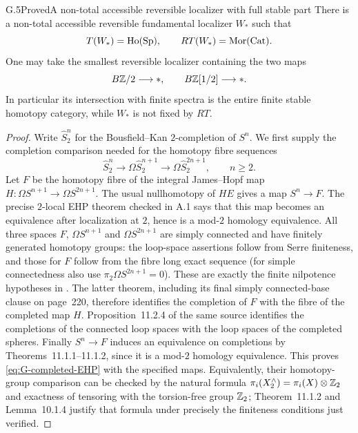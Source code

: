 \begin{claim}{G.5}{Proved}{A non-total accessible reversible localizer with full stable part}
There is a non-total accessible reversible fundamental localizer $W_*$ such that
\[
 T(W_*)=\operatorname{Ho}(\mathrm{Sp}),\qquad RT(W_*)=\operatorname{Mor}(\mathrm{Cat}).
\]
One may take the smallest reversible localizer containing the two maps
\[
 B\mathbb Z/2\longrightarrow *,\qquad B\mathbb Z[1/2]\longrightarrow *.
\]
In particular its intersection with finite spectra is the entire finite stable homotopy category, while $W_*$ is not fixed by $RT$.
\end{claim}
\begin{proof}
Write $\widehat S^n_2$ for the Bousfield--Kan $2$-completion of $S^n$. We first supply the completion comparison needed for the homotopy fibre sequences
\begin{equation}\label{eq:G-completed-EHP}
 \widehat S^n_2\longrightarrow\Omega\widehat S^{n+1}_2
       \longrightarrow\Omega\widehat S^{2n+1}_2,
 \qquad n\geq2.
\end{equation}
Let $F$ be the homotopy fibre of the integral James--Hopf map
$H:\Omega S^{n+1}\to\Omega S^{2n+1}$. The usual nullhomotopy of $HE$ gives a map $S^n\to F$. The precise $2$-local EHP theorem checked in A.1 says that this map becomes an equivalence after localization at $2$, hence is a mod-$2$ homology equivalence. All three spaces $F$, $\Omega S^{n+1}$ and $\Omega S^{2n+1}$ are simply connected and have finitely generated homotopy groups: the loop-space assertions follow from Serre finiteness, and those for $F$ follow from the fibre long exact sequence (for simple connectedness also use $\pi_2\Omega S^{2n+1}=0$). These are exactly the finite nilpotence hypotheses in \cite[Theorem 4.5.2 and Theorem 11.2.6]{FGHMayPonto2012}. The latter theorem, including its final simply connected-base clause on page~220, therefore identifies the completion of $F$ with the fibre of the completed map $H$. Proposition~11.2.4 of the same source identifies the completions of the connected loop spaces with the loop spaces of the completed spheres. Finally $S^n\to F$ induces an equivalence on completions by Theorems~11.1.1--11.1.2, since it is a mod-$2$ homology equivalence. This proves \eqref{eq:G-completed-EHP} with the specified maps. Equivalently, their homotopy-group comparison can be checked by the natural formula $\pi_i(X^{\wedge}_2)=\pi_i(X)\otimes\mathbb Z_2$ and exactness of tensoring with the torsion-free group $\mathbb Z_2$; Theorem~11.1.2 and Lemma~10.1.4 justify that formula under precisely the finiteness conditions just verified.


\end{proof}

